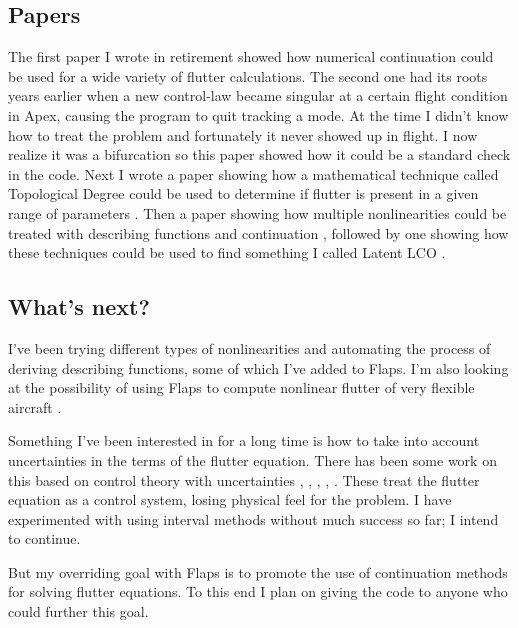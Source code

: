 \documentclass[11pt,openany,twoside]{book}
\numberwithin{equation}{section}		%
\begin{document}
\subsection{Papers}
The first paper I wrote in retirement \cite{meyer2014unified} showed how
numerical continuation could be used for a wide variety of flutter
calculations. The second one \cite{meyer2015continuation}
had its roots years earlier when a new control-law became singular
at a certain flight condition
in Apex, causing the program to quit tracking a mode.
At the time I didn't know how to treat the problem and fortunately it
never showed up in flight. I now realize it was a bifurcation so this
paper showed how it could be a standard check in the code.
Next I wrote a paper showing how a mathematical technique called
Topological Degree could be used to determine if flutter is present
in a given range of parameters \cite{meyer2015topological}.
Then a paper showing how multiple nonlinearities could be treated with
describing functions and continuation \cite{meyer2016continuation},
followed by one showing how these techniques could be used to find
something I called Latent LCO \cite{meyer2021latent}.


\subsection{What's next?}
I've been trying different types of nonlinearities and automating
the process of deriving describing functions, some of which I've added
to Flaps. I'm  also looking at the possibility of using Flaps to
compute nonlinear flutter of very flexible aircraft \cite{patil2001limit}.

Something I've been interested in for a long time is how to
take into account uncertainties in the terms of the flutter equation.
There has been some work on this based on control theory with uncertainties
\cite{danowsky2010evaluation}, \cite{iannelli2017nonlinear}, \cite{dai2014methods},
\cite{bueno2015flutter},
\cite{borglund2004mu}.
These treat the flutter equation as a control system, losing physical
feel for the problem. I have experimented with using interval methods
\cite{neumaier1990interval} without much success so far; I intend to
continue.

But my overriding goal with Flaps is to promote the use of continuation
methods for solving flutter equations. To this end I plan on giving the
code to anyone who could further this goal.


\newpage

% 


\newpage
{}
\printindex
\end{document}
